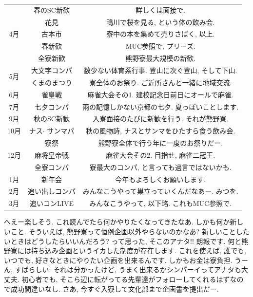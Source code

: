 \documentclass[10pt,b5jsbook,dvips,dvipdfmx,openany]{jsbook}
\theoremstyle{definition}
\begin{document}
\begin{table}[htb]
  \begin{tabular}{|c||c|c|} \hline
	\multirow{5}{*}{4月}	& 春のSC新歓		& 詳しくは面接で.   \\
    						& 花見			& 鴨川で桜を見る, という体の飲み会.  \\
      						& 古本市			& 寮中の本を集めて売りさばく, 以上. \\
    	  					& 春新歓			& MUC参照で, プリーズ.   \\  %
      						& 全寮新歓		& 熊野寮最大規模の新歓.  \\ \hline
	\multirow{2}{*}{5月}	& 大文字コンパ	& 数少ない体育系行事. 登山に次ぐ登山, そして下山.  \\
						& くまのまつり	& 寮全体のお祭り. ご近所さんと一緒に地域交流.  \\ \hline
			6月			& 雀皇戦			& 麻雀大会その1. 建校記念日前日にオールで麻雀.  \\ \hline
			7月			& 七夕コンパ		& 雨の記憶しかない京都の七夕. 夏っぽいことします.  \\ \hline
			9月			& 秋のSC新歓		& 入寮面接のたびに新歓を行う. それが熊野寮.  \\ \hline
			10月			& ナス$ \cdot $ サンマパ	& 秋の風物詩, ナスとサンマをひたすら食う飲み会.  \\ \hline
	\multirow{3}{*}{12月}	& 寮祭			& 熊野寮全体で行う年に一度のお祭りだー.  \\
						& 麻将皇帝戦		& 麻雀大会その2. 目指せ, 麻雀二冠王. \\
						& 全寮コンパ		& 寮最大のコンパ, と言っても過言ではないかも.  \\ \hline
			1月			& 新年会			& 今年もよろしくお願いします. \\ \hline
			2月			& 追い出しコンパ	& みんなこうやって巣立っていくんだなあー. みつを.  \\ \hline
			3月			& 追いコンLIVE	& みんなこうやって, 以下略. これもMUC参照で.  \\ \hline
  \end{tabular}
\end{table}

 		へえー楽しそう. これ読んでたら何かやりたくなってきたなあ. しかも何か新しいこと. そういえば, 熊野寮って恒例企画以外やらないのかなあ?  新しいことしたいときはどうしたらいいんだろう?  って思った, そこのアナタ!!  朗報です. 何と熊野寮には持ち込み企画というイカした制度が存在します. これを使えば, 誰でも, いつでも, 好きなときにやりたい企画を出来るんです. しかもお金は寮負担. うーん, すばらしい. それは分かったけど, うまく出来るかシンパーイってアナタも大丈夫. 初心者でも, そこら辺に転がってる先輩達がフォローしてくれるはずなので成功間違いなし. さあ, 今すぐ入寮して文化部まで企画書を提出だー.
\end{document}
